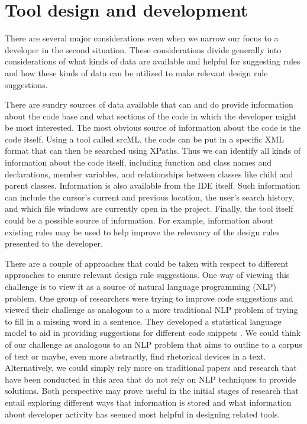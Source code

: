 \documentclass[12pt]{article}
\begin{document}
\section{Tool design and development}
There are several major considerations even when we narrow our focus to a developer in the second situation. These considerations divide generally into considerations of what kinds of data are available and helpful for suggesting rules and how these kinds of data can be utilized to make relevant design rule suggestions.

There are sundry sources of data available that can and do provide information about the code base and what sections of the code in which the developer might be most interested. The most obvious source of information about the code is the code itself. Using a tool called srcML, the code can be put in a specific XML format that can then be searched using XPaths. Thus we can identify all kinds of information about the code itself, including function and class names and declarations, member variables, and relationships between classes like child and parent classes. Information is also available from the IDE itself. Such information can include the cursor's current and previous location, the user's search history, and which file windows are currently open in the project. Finally, the tool itself could be a possible source of information. For example, information about existing rules may be used to help improve the relevancy of the design rules presented to the developer.

There are a couple of approaches that could be taken with respect to different approaches to ensure relevant design rule suggestions. One way of viewing this challenge is to view it as a source of natural language programming (NLP) problem. One group of researchers were trying to improve code suggestions and viewed their challenge as analogous to a more traditional NLP problem of trying to fill in a missing word in a sentence. They developed a statistical language model to aid in providing suggestions for different code snippets \cite{RaychevEtAl2014}. We could think of our challenge as analogous to an NLP problem that aims to outline to a corpus of text or maybe, even more abstractly, find rhetorical devices in a text. Alternatively, we could simply rely more on traditional papers and research that have been conducted in this area that do not rely on NLP techniques to provide solutions. Both perspective may prove useful in the initial stages of research that entail exploring different ways that information is stored and what information about developer activity has seemed most helpful in designing related tools. 
\end{document}
